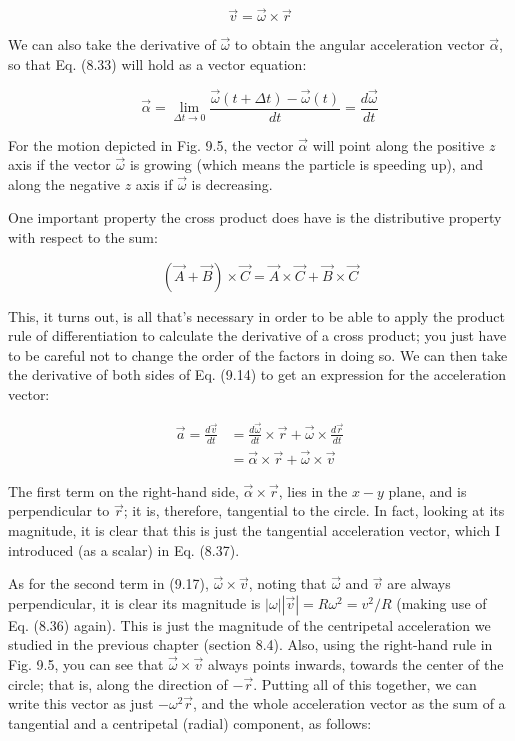 \documentclass[10pt]{article}
\begin{document}
\begin{equation*}
\vec{v}=\vec{\omega} \times \vec{r} \tag{9.14}
\end{equation*}


We can also take the derivative of $\vec{\omega}$ to obtain the angular acceleration vector $\vec{\alpha}$, so that Eq. (8.33) will hold as a vector equation:


\begin{equation*}
\vec{\alpha}=\lim _{\Delta t \rightarrow 0} \frac{\vec{\omega}(t+\Delta t)-\vec{\omega}(t)}{d t}=\frac{d \vec{\omega}}{d t} \tag{9.15}
\end{equation*}


For the motion depicted in Fig. 9.5, the vector $\vec{\alpha}$ will point along the positive $z$ axis if the vector $\vec{\omega}$ is growing (which means the particle is speeding up), and along the negative $z$ axis if $\vec{\omega}$ is decreasing.

One important property the cross product does have is the distributive property with respect to the sum:


\begin{equation*}
(\vec{A}+\vec{B}) \times \vec{C}=\vec{A} \times \vec{C}+\vec{B} \times \vec{C} \tag{9.16}
\end{equation*}


This, it turns out, is all that's necessary in order to be able to apply the product rule of differentiation to calculate the derivative of a cross product; you just have to be careful not to change the order of the factors in doing so. We can then take the derivative of both sides of Eq. (9.14) to get an expression for the acceleration vector:


\begin{align*}
\vec{a}=\frac{d \vec{v}}{d t} & =\frac{d \vec{\omega}}{d t} \times \vec{r}+\vec{\omega} \times \frac{d \vec{r}}{d t} \\
& =\vec{\alpha} \times \vec{r}+\vec{\omega} \times \vec{v} \tag{9.17}
\end{align*}


The first term on the right-hand side, $\vec{\alpha} \times \vec{r}$, lies in the $x-y$ plane, and is perpendicular to $\vec{r}$; it is, therefore, tangential to the circle. In fact, looking at its magnitude, it is clear that this is just the tangential acceleration vector, which I introduced (as a scalar) in Eq. (8.37).

As for the second term in (9.17), $\vec{\omega} \times \vec{v}$, noting that $\vec{\omega}$ and $\vec{v}$ are always perpendicular, it is clear its magnitude is $|\omega||\vec{v}|=R \omega^{2}=v^{2} / R$ (making use of Eq. (8.36) again). This is just the magnitude of the centripetal acceleration we studied in the previous chapter (section 8.4). Also, using the right-hand rule in Fig. 9.5, you can see that $\vec{\omega} \times \vec{v}$ always points inwards, towards the center of the circle; that is, along the direction of $-\vec{r}$. Putting all of this together, we can write this vector as just $-\omega^{2} \vec{r}$, and the whole acceleration vector as the sum of a tangential and a centripetal (radial) component, as follows:
\end{document}
